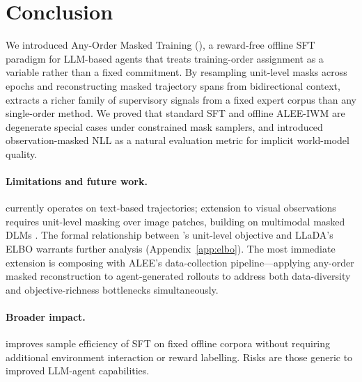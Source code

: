 \section{Conclusion}
\label{sec:conclusion}

We introduced Any-Order Masked Training (\aomt{}), a reward-free offline SFT
paradigm for LLM-based agents that treats training-order assignment as a
variable rather than a fixed commitment. By resampling unit-level masks across
epochs and reconstructing masked trajectory spans from bidirectional context,
\aomt{} extracts a richer family of supervisory signals from a fixed expert
corpus than any single-order method. We proved that standard SFT and offline
ALEE-IWM are degenerate special cases under constrained mask samplers, and
introduced observation-masked NLL as a natural evaluation metric for implicit
world-model quality.

\paragraph{Limitations and future work.}
\aomt{} currently operates on text-based trajectories; extension to visual
observations requires unit-level masking over image patches, building on
multimodal masked DLMs \citep{zhou2025lladav}. The formal relationship between
\aomt{}'s unit-level objective and LLaDA's ELBO warrants further analysis
(Appendix~\ref{app:elbo}). The most immediate extension is composing \aomt{}
with ALEE's data-collection pipeline---applying any-order masked reconstruction
to agent-generated rollouts to address both data-diversity and objective-richness
bottlenecks simultaneously.

\paragraph{Broader impact.}
\aomt{} improves sample efficiency of SFT on fixed offline corpora without
requiring additional environment interaction or reward labelling. Risks are those
generic to improved LLM-agent capabilities.
